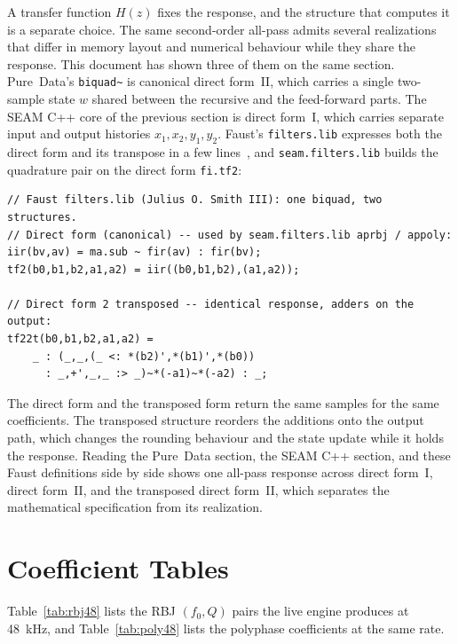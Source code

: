 \documentclass[11pt,a4paper]{article}
\begin{document}
A transfer function $H(z)$ fixes the response, and the structure that computes it is a separate choice.
The same second-order all-pass admits several realizations that differ in memory layout and numerical behaviour while they share the response.
This document has shown three of them on the same section.
Pure~Data's \texttt{biquad\textasciitilde} is canonical direct form~II, which carries a single two-sample state $w$ shared between the recursive and the feed-forward parts.
The SEAM C++ core of the previous section is direct form~I, which carries separate input and output histories $x_1, x_2, y_1, y_2$.
Faust's \texttt{filters.lib} expresses both the direct form and its transpose in a few lines~\cite{SmithDirectForms}, and \texttt{seam.filters.lib} builds the quadrature pair on the direct form \texttt{fi.tf2}:

\begin{lstlisting}[basicstyle=\small\ttfamily,frame=single]
// Faust filters.lib (Julius O. Smith III): one biquad, two structures.
// Direct form (canonical) -- used by seam.filters.lib aprbj / appoly:
iir(bv,av) = ma.sub ~ fir(av) : fir(bv);
tf2(b0,b1,b2,a1,a2) = iir((b0,b1,b2),(a1,a2));

// Direct form 2 transposed -- identical response, adders on the output:
tf22t(b0,b1,b2,a1,a2) =
    _ : (_,_,(_ <: *(b2)',*(b1)',*(b0))
      : _,+',_,_ :> _)~*(-a1)~*(-a2) : _;
\end{lstlisting}

The direct form and the transposed form return the same samples for the same coefficients.
The transposed structure reorders the additions onto the output path, which changes the rounding behaviour and the state update while it holds the response.
Reading the Pure~Data section, the SEAM C++ section, and these Faust definitions side by side shows one all-pass response across direct form~I, direct form~II, and the transposed direct form~II, which separates the mathematical specification from its realization.

\appendix

\section{Coefficient Tables}

Table~\ref{tab:rbj48} lists the RBJ $(f_0, Q)$ pairs the live engine produces at \SI{48}{\kilo\hertz}, and Table~\ref{tab:poly48} lists the polyphase coefficients at the same rate.
\end{document}
